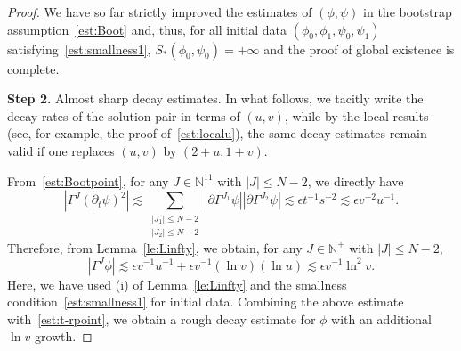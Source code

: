 \documentclass[10pt,a4paper]{amsart}
\def \pt{\partial_{t}}
\begin{document}
\begin{proof}
\smallskip
We have so far strictly improved the estimates of $(\phi,\psi)$ in the bootstrap assumption~\eqref{est:Boot} and, thus, for all initial data $(\phi_{0},\phi_1, {\psi}_{0},\psi_1)$ satisfying~\eqref{est:smallness1}, {$S_{*}(\phi_{0},\psi_{0})=+\infty$ and} the proof of global existence is complete.

\smallskip
\textbf{Step 2.} Almost sharp decay estimates.
In what follows, we tacitly write the decay rates of the solution pair in terms of $(u,v)$,
while by the local results (see, for example, the proof of~\eqref{est:localu}), the same decay estimates remain valid if one replaces $(u,v)$ by $(2+u,1+v)$.

\smallskip
From~\eqref{est:Bootpoint}, for any $J\in \mathbb{N}^{11}$ with $|J|\le N-2$, we directly have 
\begin{equation*}
    \left|\Gamma^{J}(\pt \psi )^{2}\right|
    \lesssim \sum_{\substack{|J_{1}|\le N-2\\ |J_{2}|\le N-2}}
    \left|\partial \Gamma^{J_{1}}\psi\right|
    \left|\partial \Gamma^{J_{2}}\psi\right|\lesssim \epsilon t^{-1}s^{-2}\lesssim \epsilon v^{-2}u^{-1}.
\end{equation*}
Therefore, from Lemma~\ref{le:Linfty},  we obtain,   for any $J\in \mathbb{N}^{+}$ with $|J|\le N-2$,
\begin{equation*}
    \left| \Gamma^{J}\phi\right|\lesssim 
    \epsilon v^{-1}u^{-1}+\epsilon v^{-1}(\ln v) (\ln u)\lesssim \epsilon v^{-1}\ln^{2}v.
\end{equation*}
Here, we have used (i) of Lemma~\ref{le:Linfty} and the smallness condition~\eqref{est:smallness1} for initial data.
Combining the above estimate with~\eqref{est:t-rpoint}, we obtain a rough decay estimate for $\phi$ with an additional $\ln v$ growth.


\end{proof}
\end{document}
